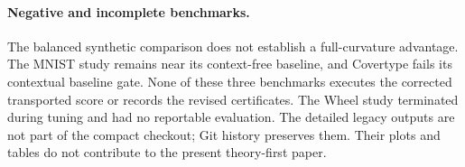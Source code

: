 \paragraph{Negative and incomplete benchmarks.}
The balanced synthetic comparison does not establish a full-curvature advantage.
The MNIST study remains near its context-free baseline, and Covertype fails its
contextual baseline gate.  None of these three benchmarks executes the corrected
transported score or records the revised certificates.  The Wheel study
terminated during tuning and had no reportable evaluation.  The detailed legacy
outputs are not part of the compact checkout; Git history preserves them.  Their
plots and tables do not contribute to the present theory-first paper.

\FloatBarrier
